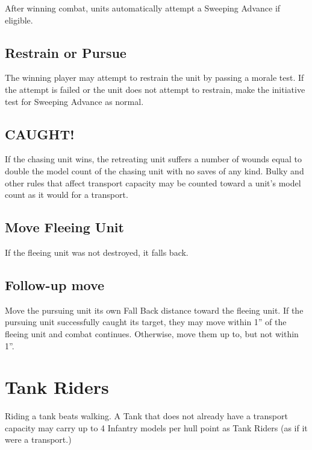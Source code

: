 \documentclass[letterpaper,twocolumn,oneside,titlepage]{book}
\begin{document}
After winning combat, units automatically attempt a Sweeping Advance if
eligible.

\subsection{\texorpdfstring{\textbf{Restrain or
Pursue}}{Restrain or Pursue}}\label{restrain-or-pursue}

The winning player may attempt to restrain the unit by passing a morale
test. If the attempt is failed or the unit does not attempt to restrain,
make the initiative test for Sweeping Advance as normal.

\subsection{\texorpdfstring{\textbf{CAUGHT!}}{CAUGHT!}}\label{caught}

If the chasing unit wins, the retreating unit suffers a number of wounds
equal to double the model count of the chasing unit with no saves of any
kind. Bulky and other rules that affect transport capacity may be
counted toward a unit's model count as it would for a transport.

\subsection{\texorpdfstring{\textbf{Move Fleeing
Unit}}{Move Fleeing Unit}}\label{move-fleeing-unit}

If the fleeing unit was not destroyed, it falls back.

\subsection{\texorpdfstring{\textbf{Follow-up
move}}{Follow-up move}}\label{follow-up-move}

Move the pursuing unit its own Fall Back distance toward the fleeing
unit. If the pursuing unit successfully caught its target, they may move
within 1'' of the fleeing unit and combat continues. Otherwise, move
them up to, but not within 1''.

\section{\texorpdfstring{\textbf{Tank
Riders}}{Tank Riders}}\label{tank-riders}

Riding a tank beats walking. A Tank that does not already have a
transport capacity may carry up to 4 Infantry models per hull point as
Tank Riders (as if it were a transport.)
\end{document}
